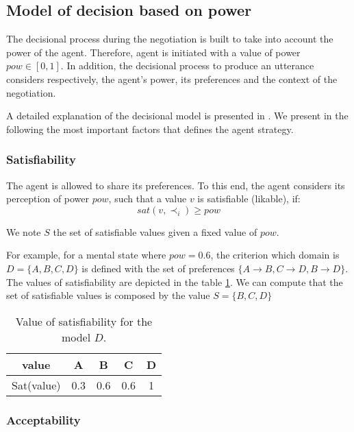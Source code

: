 \documentclass{llncs}
\begin{document}
		 \subsection{Model of decision based on power}
		The decisional process during the negotiation is built to take into account the power of the agent. Therefore, agent is initiated with a value of power $pow \in [0,1]$. In addition, the decisional process to produce an utterance considers respectively, the agent's power, its preferences and the context of the negotiation.  
		
		A detailed explanation of the decisional model is presented in \cite{} . We present in the following the most important factors that defines the agent strategy.
		
		\subsubsection{Satisfiability }
		The agent is allowed to share its preferences. %
		To this end, the agent considers its perception of power $pow$, such that a value $v$ is satisfiable (likable), if:  
		\begin{equation}
		 	sat(v, \prec_i) \geq pow
		\end{equation}
	
		We note $S$ the set of satisfiable values given a fixed value of $pow$.
		
		\par For example, for  a mental state where $pow =0.6$, the criterion which domain is  $D =\{A, B, C, D\}$ is defined with the set of preferences $\{A \rightarrow  B, C \rightarrow  D , B \rightarrow D \}$. The values of satisfiability are depicted in the table \ref{sat}. We can compute that the set of satisfiable values is composed by the value $ S = \{B, C, D\}$ 
			 \begin{table}
			 	\centering
			 	\begin{tabular}{ |c|c|c|c|c| }
			 		\hline				
			 		value & A & B & C & D \\
			 		\hline

			 		\hline
			 		Sat(value) & 0.3 & 0.6 & 0.6 & 1 \\
			 		\hline
			 		
			 	\end{tabular}
			 	\caption{Value of satisfiability for the model $D$.}
			 	\label{sat}
			 \end{table}
		
		
	\subsubsection{Acceptability}
	 
\end{document}
